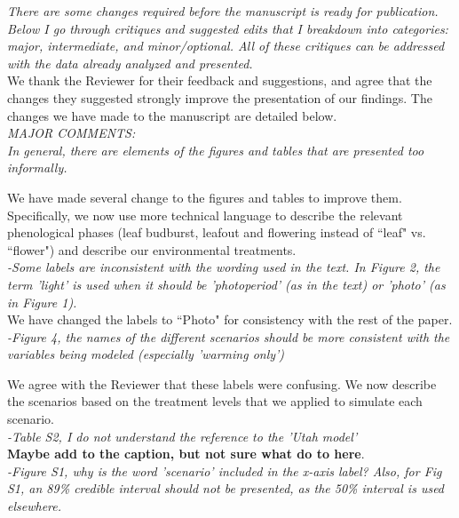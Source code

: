 \documentclass[11pt]{article}
\begin{document}
\emph{There are some changes required before the manuscript is ready for publication. Below I go through critiques and suggested edits that I breakdown into categories: major, intermediate, and minor/optional. All of these critiques can be addressed with the data already analyzed and presented.}\\

We thank the Reviewer for their feedback and suggestions, and agree that the changes they suggested strongly improve the presentation of our findings. The changes we have made to the manuscript are detailed below.\\

\emph{MAJOR COMMENTS:\\
In general, there are elements of the figures and tables that are presented too informally.}

We have made several change to the figures and tables to improve them. Specifically, we now use more technical language to describe the relevant phenological phases (leaf budburst, leafout and flowering instead of ``leaf" vs. ``flower") and describe our environmental treatments.  \\

\emph{-Some labels are inconsistent with the wording used in the text. In Figure 2, the term 'light' is used when it should be 'photoperiod' (as in the text) or 'photo' (as in Figure 1).}\\

\noindent We have changed the labels to ``Photo" for consistency with the rest of the paper.\\

\emph{-Figure 4, the names of the different scenarios should be more consistent with the variables being modeled (especially 'warming only')}

\noindent We agree with the Reviewer that these labels were confusing. We now describe the scenarios based on the treatment levels that we applied to simulate each scenario.\\

\emph{-Table S2, I do not understand the reference to the 'Utah model'}\\

\textbf{Maybe add to the caption, but not sure what do to here}.\\


\emph{-Figure S1, why is the word 'scenario' included in the x-axis label? Also, for Fig S1, an 89\% credible interval should not be presented, as the 50\% interval is used elsewhere.}\\
\end{document}
